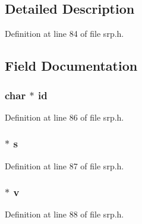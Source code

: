 \subsection{Detailed Description}


Definition at line 84 of file srp.\+h.



\subsection{Field Documentation}
\subsubsection[{\texorpdfstring{id}{id}}]{\setlength{\rightskip}{0pt plus 5cm}char $\ast$ id}\hypertarget{struct_s_r_p__user__pwd__st_a0478f7cd8e97b1656f1b7a03ced467c4}{}\label{struct_s_r_p__user__pwd__st_a0478f7cd8e97b1656f1b7a03ced467c4}


Definition at line 86 of file srp.\+h.

\subsubsection[{\texorpdfstring{s}{s}}]{ $\ast$ s}\hypertarget{struct_s_r_p__user__pwd__st_a174fa2d60f08e563a4405911f6c81172}{}\label{struct_s_r_p__user__pwd__st_a174fa2d60f08e563a4405911f6c81172}


Definition at line 87 of file srp.\+h.

\subsubsection[{\texorpdfstring{v}{v}}]{ $\ast$ v}\hypertarget{struct_s_r_p__user__pwd__st_a449bad7793a9afed36db8c4ef3a71a41}{}\label{struct_s_r_p__user__pwd__st_a449bad7793a9afed36db8c4ef3a71a41}


Definition at line 88 of file srp.\+h.

